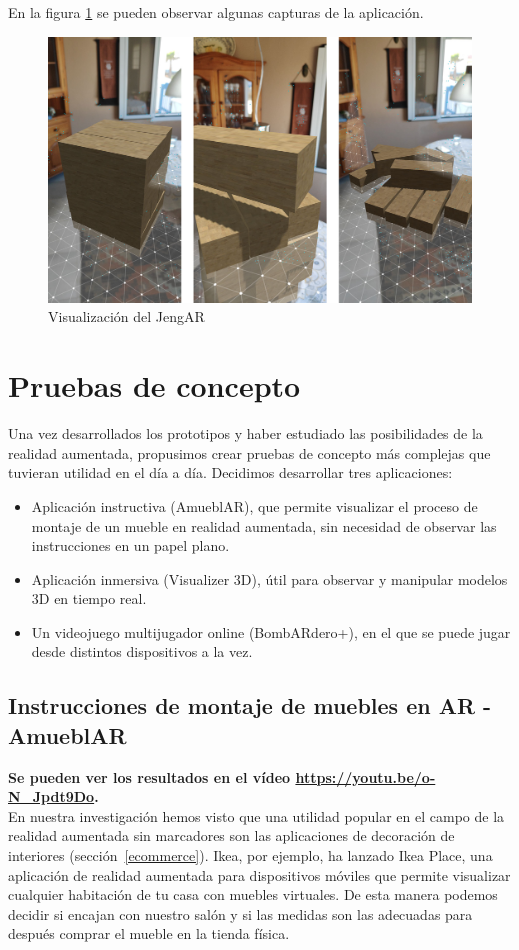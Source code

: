 En la figura \ref{JenAR} se pueden observar algunas capturas de la aplicación.
\begin{figure}[H]
    \centering
    \includegraphics[width=\linewidth]{Images/Jenga.jpg}
    \caption{Visualización del JengAR}
    \label{JenAR}
\end{figure}

\section{Pruebas de concepto}
Una vez desarrollados los prototipos y haber estudiado las posibilidades de la realidad aumentada, propusimos crear pruebas de concepto más complejas que tuvieran utilidad en el día a día. Decidimos desarrollar tres aplicaciones:
\begin{itemize}
    \item Aplicación instructiva (AmueblAR), que permite visualizar el proceso de montaje de un mueble en realidad aumentada, sin necesidad de observar las instrucciones en un papel plano.
    \item Aplicación inmersiva (Visualizer 3D), útil para observar y manipular modelos 3D en tiempo real.
    \item Un videojuego multijugador online (BombARdero+), en el que se puede jugar desde distintos dispositivos a la vez.
\end{itemize}

\subsection{Instrucciones de montaje de muebles en AR - AmueblAR}
\textbf{Se pueden ver los resultados en el vídeo \url{https://youtu.be/o-N_Jpdt9Do}.}\\
En nuestra investigación hemos visto que una utilidad popular en el campo de la realidad aumentada sin marcadores son las aplicaciones de decoración de interiores (sección~\ref{ecommerce}). Ikea, por ejemplo, ha lanzado Ikea Place, una aplicación de realidad aumentada para dispositivos móviles que permite visualizar cualquier habitación de tu casa con muebles virtuales. De esta manera podemos decidir si encajan con nuestro salón y si las medidas son las adecuadas para después comprar el mueble en la tienda física.\\

